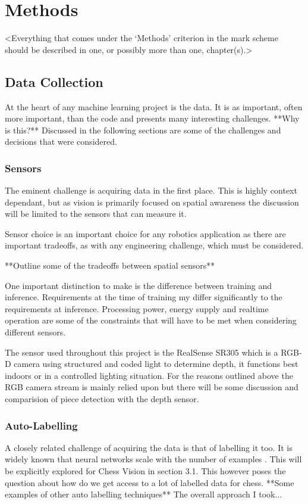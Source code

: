\chapter{Methods}
\label{chapter2}

<Everything that comes under the `Methods' criterion in the mark scheme should be described in one, or possibly more than one, chapter(s).>

\section{Data Collection}
At the heart of any machine learning project is the data.  
It is as important, often more important, than the code and presents many interesting
challenges.  **Why is this?**
Discussed in the following sections are some of the challenges and decisions that were considered.

\subsection{Sensors}
The eminent challenge is acquiring data in the first place.  This is highly context 
dependant, but as vision is primarily focused on spatial awareness the discussion 
will be limited to the sensors that can measure it.

Sensor choice is an important choice for any robotics application as there are 
important tradeoffs, as with any engineering challenge, which must be considered.

**Outline some of the tradeoffs between spatial sensors**

One important distinction to make is the difference between training and inference.
Requirements at the time of training my differ significantly to the requirements at 
inference.  Processing power, energy supply and realtime operation are some
of the constraints that will have to be met when considering different sensors.

The sensor used throughout this project is the RealSense SR305 which is a RGB-D camera
using structured and coded light to determine depth, it functions best indoors or in a 
controlled lighting situation.  For the reasons outlined above the RGB camera stream is 
mainly relied upon but there will be some discussion and comparision of piece detection 
with the depth sensor.  

\subsection{Auto-Labelling}
A closely related challenge of acquiring the data is that of labelling it too.
It is widely known that neural networks scale with the number of examples \cite{}.  
This will be explicitly explored for Chess Vision in section 3.1.
This however poses the question about how do we get access to a lot of labelled data 
for chess.  **Some examples of other auto labelling techniques**
The overall approach I took...


